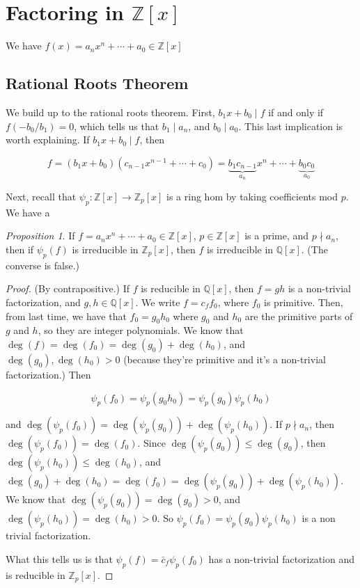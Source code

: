 \documentclass[12pt]{article}
\def\Z{{\mathbb Z}}
\def\Q{{\mathbb Q}}
\theoremstyle{remark}
\newtheorem{proposition}{Proposition}
\theoremstyle{remark}
\theoremstyle{remark}
\theoremstyle{remark}
\theoremstyle{remark}
\begin{document}
\section{Factoring in $\Z[x]$}

We have $f(x) = a_n x^n + \cdots + a_0 \in \Z[x]$

\subsection{Rational Roots Theorem}

We build up to the rational roots theorem. First, $b_1 x + b_0 \mid f$ if and
only if $f(-b_0 / b_1) = 0$, which tells us that $b_1 \mid a_n$, and $b_0 \mid
a_0$. This last implication is worth explaining. If $b_1 x + b_0 \mid f$, then 

\[
  f = (b_1 x + b_0)(c_{n - 1} x^{n - 1} + \cdots + c_0) = \underbrace{b_1 c_{n - 1}}_{a_n} x^n + \cdots + \underbrace{b_0 c_0}_{a_0}
\]

Next, recall that $\psi_p: \Z[x] \to \Z_p[x]$ is a ring hom by taking
coefficients mod $p$. We have a 

\begin{proposition}
  If $f = a_n x^n + \cdots + a_0 \in \Z[x]$, $p \in \Z[x]$ is a prime, and $p
  \nmid a_n$, then if $\psi_p (f)$ is irreducible in $\Z_p[x]$, then $f$ is
  irreducible in $\Q[x]$. (The converse is false.)
\end{proposition}

\begin{proof}
  (By contrapositive.) If $f$ is reducible in $\Q[x]$, then $f = gh$ is a
  non-trivial factorization, and $g, h \in \Q[x]$. We write $f = c_f f_0$, where
  $f_0$ is primitive. Then, from last time, we have that $f_0 = g_0 h_0$ where
  $g_0$ and $h_0$ are the primitive parts of $g$ and $h$, so they are integer
  polynomials. We know that $\deg(f) = \deg(f_0) = \deg(g_0) + \deg(h_0)$, and
  $\deg(g_0), \deg(h_0) > 0$ (because they're primitive and it's a non-trivial
  factorization.) Then

  \[
    \psi_p(f_0) = \psi_p(g_0 h_0) = \psi_p(g_0) \psi_p(h_0)
  \]

  and $\deg(\psi_p(f_0)) = \deg(\psi_p(g_0)) + \deg(\psi_p(h_0))$. If $p \nmid
  a_n$, then $\deg(\psi_p(f_0)) = \deg(f_0)$. Since $\deg(\psi_p(g_0)) \le
  \deg(g_0)$, then $\deg(\psi_p(h_0)) \le \deg(h_0)$, and $\deg(g_0) + \deg(h_0)
  = \deg(f_0) = \deg(\psi_p(g_0)) + \deg(\psi_p(h_0))$. We know that
  $\deg(\psi_p(g_0)) = \deg(g_0) > 0$, and $\deg(\psi_p(h_0)) = \deg(h_0) > 0$.
  So $\psi_p(f_0) = \psi_p(g_0) \psi_p(h_0)$ is a non trivial factorization.
  
  What this tells us is that $\psi_p(f) = \bar c_f \psi_p(f_0)$ has a
  non-trivial factorization and is reducible in $\Z_p[x]$.
\end{proof}
\end{document}
